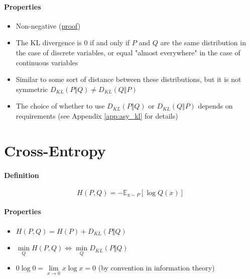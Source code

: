 \documentclass[12pt, a4paper]{article}
\def\rmx{\mathrm{x}}
\newcommand{\expect}[3]{\mathbb{E}_{#1 \sim #2} \left[ #3 \right]}
\begin{document}
\paragraph{Properties}
\begin{itemize}
    \item Non-negative (\hyperref[theo:dkl]{proof})
    \item The KL divergence is $0$ if and only if $P$ and $Q$ are the same distribution in the case of discrete variables, or equal "almost everywhere" in the case of continuous variables
    \item Similar to some sort of distance between these distributions, but it is not symmetric $D_{KL}(P \Vert Q) \neq D_{KL}(Q \Vert P)$
    \item The choice of whether to use $D_{KL}(P \Vert Q)$ or $D_{KL}(Q \Vert P)$ depends on requirements (see Appendix \ref{app:asy_kl} for details)
\end{itemize}


\section{Cross-Entropy}
\paragraph{Definition}
\[
    H(P, Q) = - \expect{\rmx}{P}{\log Q(x)}
\]
\paragraph{Properties}
\begin{itemize}
    \item $ H(P,Q) = H(P) + D_{KL}(P \Vert Q) $
    \item $\min\limits_Q H(P, Q) \Longleftrightarrow \min\limits_Q D_{KL}(P \Vert Q)$
    \item $0 \log 0 = \lim\limits_{x \to 0} x \log x = 0$ (by convention in information theory)
\end{itemize}
\end{document}
